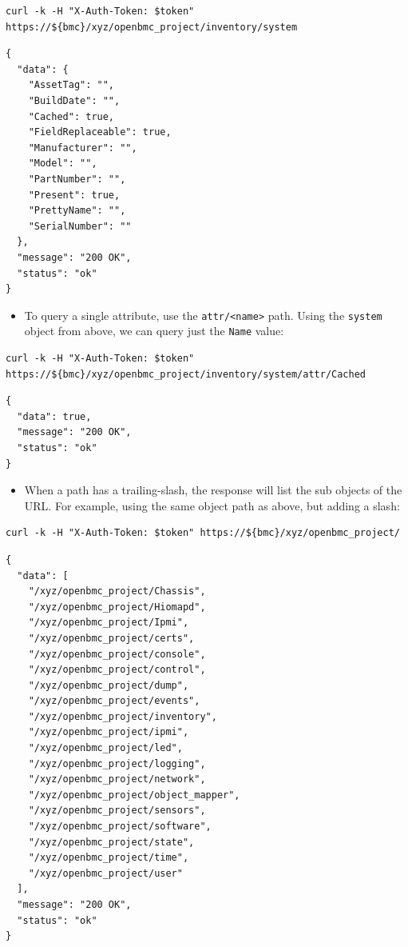 \begin{verbatim}
curl -k -H "X-Auth-Token: $token" https://${bmc}/xyz/openbmc_project/inventory/system
\end{verbatim}

\begin{verbatim}
{
  "data": {
    "AssetTag": "",
    "BuildDate": "",
    "Cached": true,
    "FieldReplaceable": true,
    "Manufacturer": "",
    "Model": "",
    "PartNumber": "",
    "Present": true,
    "PrettyName": "",
    "SerialNumber": ""
  },
  "message": "200 OK",
  "status": "ok"
}
\end{verbatim}

\begin{itemize}
\tightlist
\item
  To query a single attribute, use the
  \texttt{attr/\textless{}name\textgreater{}} path. Using the
  \texttt{system} object from above, we can query just the \texttt{Name}
  value:
\end{itemize}

\begin{verbatim}
curl -k -H "X-Auth-Token: $token" https://${bmc}/xyz/openbmc_project/inventory/system/attr/Cached
\end{verbatim}

\begin{verbatim}
{
  "data": true,
  "message": "200 OK",
  "status": "ok"
}
\end{verbatim}

\begin{itemize}
\tightlist
\item
  When a path has a trailing-slash, the response will list the sub
  objects of the URL. For example, using the same object path as above,
  but adding a slash:
\end{itemize}

\begin{verbatim}
curl -k -H "X-Auth-Token: $token" https://${bmc}/xyz/openbmc_project/
\end{verbatim}

\begin{verbatim}
{
  "data": [
    "/xyz/openbmc_project/Chassis",
    "/xyz/openbmc_project/Hiomapd",
    "/xyz/openbmc_project/Ipmi",
    "/xyz/openbmc_project/certs",
    "/xyz/openbmc_project/console",
    "/xyz/openbmc_project/control",
    "/xyz/openbmc_project/dump",
    "/xyz/openbmc_project/events",
    "/xyz/openbmc_project/inventory",
    "/xyz/openbmc_project/ipmi",
    "/xyz/openbmc_project/led",
    "/xyz/openbmc_project/logging",
    "/xyz/openbmc_project/network",
    "/xyz/openbmc_project/object_mapper",
    "/xyz/openbmc_project/sensors",
    "/xyz/openbmc_project/software",
    "/xyz/openbmc_project/state",
    "/xyz/openbmc_project/time",
    "/xyz/openbmc_project/user"
  ],
  "message": "200 OK",
  "status": "ok"
}
\end{verbatim}

